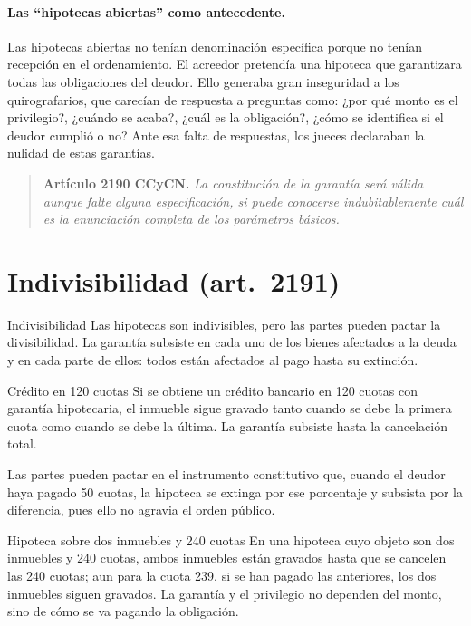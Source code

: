 \documentclass[12pt,oneside]{book}
\begin{document}
\paragraph{Las ``hipotecas abiertas'' como antecedente.} Las hipotecas abiertas no tenían denominación específica porque no tenían recepción en el ordenamiento. El acreedor pretendía una hipoteca que garantizara todas las obligaciones del deudor. Ello generaba gran inseguridad a los quirografarios, que carecían de respuesta a preguntas como: ¿por qué monto es el privilegio?, ¿cuándo se acaba?, ¿cuál es la obligación?, ¿cómo se identifica si el deudor cumplió o no? Ante esa falta de respuestas, los jueces declaraban la nulidad de estas garantías.

\begin{quote}
\textbf{Artículo 2190 CCyCN.} \textit{La constitución de la garantía será válida aunque falte alguna especificación, si puede conocerse indubitablemente cuál es la enunciación completa de los parámetros básicos.}
\end{quote}

\section{Indivisibilidad (art.~2191)}

\begin{definition}{Indivisibilidad}
Las hipotecas son indivisibles, pero las partes pueden pactar la divisibilidad. La garantía subsiste en cada uno de los bienes afectados a la deuda y en cada parte de ellos: todos están afectados al pago hasta su extinción.
\end{definition}

\begin{example}{Crédito en 120 cuotas}
Si se obtiene un crédito bancario en 120 cuotas con garantía hipotecaria, el inmueble sigue gravado tanto cuando se debe la primera cuota como cuando se debe la última. La garantía subsiste hasta la cancelación total.
\end{example}

Las partes pueden pactar en el instrumento constitutivo que, cuando el deudor haya pagado 50 cuotas, la hipoteca se extinga por ese porcentaje y subsista por la diferencia, pues ello no agravia el orden público.

\begin{example}{Hipoteca sobre dos inmuebles y 240 cuotas}
En una hipoteca cuyo objeto son dos inmuebles y 240 cuotas, ambos inmuebles están gravados hasta que se cancelen las 240 cuotas; aun para la cuota 239, si se han pagado las anteriores, los dos inmuebles siguen gravados. La garantía y el privilegio no dependen del monto, sino de cómo se va pagando la obligación.
\end{example}
\end{document}
